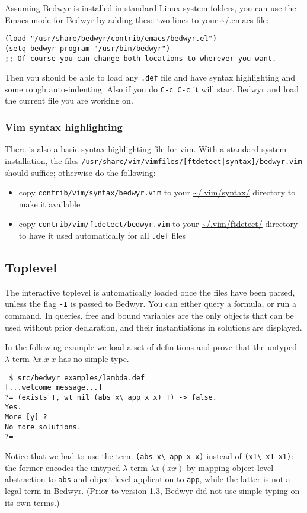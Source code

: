 Assuming Bedwyr is installed in standard Linux system folders, you can
use the Emacs mode for Bedwyr by adding these two lines to your
\url{~/.emacs} file:
\begin{verbatim}
(load "/usr/share/bedwyr/contrib/emacs/bedwyr.el")
(setq bedwyr-program "/usr/bin/bedwyr")
;; Of course you can change both locations to wherever you want.
\end{verbatim}

Then you should be able to load any \verb:.def: file
and have syntax highlighting and some rough auto-indenting.
Also if you do \verb.C-c C-c. it will start Bedwyr
and load the current file you are working on.

\subsubsection{Vim syntax highlighting}

There is also a basic syntax highlighting file for vim. With a standard
system installation, the files
\verb+/usr/share/vim/vimfiles/[ftdetect|syntax]/bedwyr.vim+ should
suffice; otherwise do the following:
\begin{itemize}
  \item copy {\tt contrib/vim/syntax/bedwyr.vim} to
    your \url{~/.vim/syntax/} directory to make it available
  \item copy {\tt contrib/vim/ftdetect/bedwyr.vim} to
    your \url{~/.vim/ftdetect/} directory to have it used automatically
    for all {\tt *.def} files
\end{itemize}

\subsection{Toplevel}

The interactive toplevel is automatically loaded once the files have
been parsed, unless the flag \verb.-I. is passed to Bedwyr. You can
either query a formula, or run a command. In queries, free and bound
variables are
the only objects that can be used without prior declaration, and their
instantiations in solutions are displayed.

In the following example we load a set of definitions and prove that
the untyped $\lambda$-term $\lambda x.x\;x$ has no simple type.

\begin{verbatim}
 $ src/bedwyr examples/lambda.def
[...welcome message...]
?= (exists T, wt nil (abs x\ app x x) T) -> false.
Yes.
More [y] ?
No more solutions.
?=
\end{verbatim}
Notice that we had to use the term \verb+(abs x\ app x x)+ instead of
\verb+(x1\ x1 x1)+: the former encodes the untyped $\lambda$-term
$\lambda x (x x)$ by mapping
object-level abstraction to {\tt abs} and object-level application to
{\tt app}, while the latter is not a legal term in Bedwyr.  (Prior to
version 1.3, Bedwyr did not use simple typing on its own terms.)

